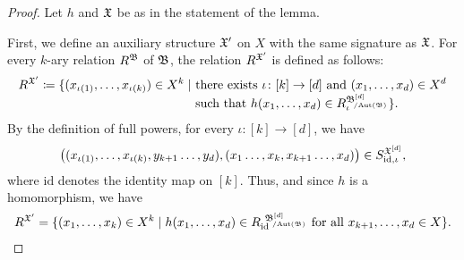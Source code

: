 \begin{proof} 
        Let $h$ and $\mathfrak{X}$ be as in the statement of the lemma. 
        
        First, we define an auxiliary structure $\mathfrak{X}'$ on $X$ with the same signature as $\mathfrak{X}$.
        For every $k$-ary relation $R^{\mathfrak{B}}$ of $\mathfrak{B}$, the relation $R^{\mathfrak{X}'}$ is defined as follows:
        \begin{align}
              R^{\struct{X}'} \coloneqq \{   (x_{\iota(1)},\dots,x_{\iota(k)})  \in X^k \mid    & \text{ there exists }   \iota\colon [k]\to[d] \text{ and }   (x_1,\dots,x_d)\in X^d   \nonumber \\    & \text{ such that  }h (x_1,\dots,x_d)\in R_\iota^{\smash{\fpwr{\struct{B}}{d}_{\orbeq{\Aut(\struct{B})}}}}\}.  \label{eq:exists}
        \end{align}  
        By the definition of full powers, for every $\iota\colon [k]\to[d]$, we have 
        \begin{align*}
             \big((x_{\iota(1)},\dots,x_{\iota(k)},y_{k+1}\dots,y_d),(x_{1}\dots,x_{k},x_{k+1}\dots,x_{d})\big)\in S^{{\mathfrak{X}}^{[d]}}_{\mathrm{id},\iota},
        \end{align*}
        where $\mathrm{id}$ denotes the identity map on $[k]$. 
        Thus, and since $h$ is a homomorphism, we have
        \begin{align}
            R^{\struct{X}'} = \{ (x_1,\dots,x_k)\in X^k \mid   h(x_1,\dots,x_d)       \in R_{\mathrm{id}}^{\ \smash{\fpwr{\struct{B}}{d}_{\orbeq{\Aut(\struct{B})}}}}   \text{ for all }   x_{k+1},\dots,x_d\in X  \}.  \label{eq:forall}
        \end{align} 
        

\end{proof}
